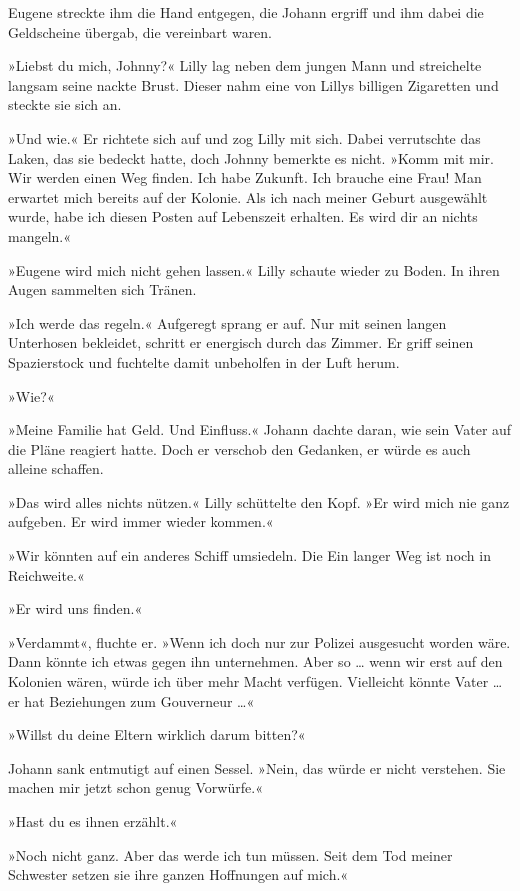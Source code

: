 Eugene streckte ihm die Hand entgegen, die Johann ergriff und ihm
dabei die Geldscheine übergab, die vereinbart waren.

\tb

»Liebst du mich, Johnny?« Lilly lag neben dem jungen Mann und
streichelte langsam seine nackte Brust. Dieser nahm eine von Lillys
billigen Zigaretten und steckte sie sich an.

»Und wie.« Er richtete sich auf und zog Lilly mit sich. Dabei
verrutschte das Laken, das sie bedeckt hatte, doch Johnny bemerkte
es nicht. »Komm mit mir. Wir werden einen Weg finden. Ich habe
Zukunft. Ich brauche eine Frau! Man erwartet mich bereits auf der
Kolonie. Als ich nach meiner Geburt ausgewählt wurde, habe ich
diesen Posten auf Lebenszeit erhalten. Es wird dir an nichts
mangeln.«

»Eugene wird mich nicht gehen lassen.« Lilly schaute wieder zu
Boden. In ihren Augen sammelten sich Tränen.

»Ich werde das regeln.« Aufgeregt sprang er auf. Nur mit seinen
langen Unterhosen bekleidet, schritt er energisch durch das Zimmer.
Er griff seinen Spazierstock und fuchtelte damit unbeholfen in der
Luft herum.

»Wie?«

»Meine Familie hat Geld. Und Einfluss.« Johann dachte daran, wie
sein Vater auf die Pläne reagiert hatte. Doch er verschob den
Gedanken, er würde es auch alleine schaffen.

»Das wird alles nichts nützen.« Lilly schüttelte den Kopf. »Er wird
mich nie ganz aufgeben. Er wird immer wieder kommen.«

»Wir könnten auf ein anderes Schiff umsiedeln. Die Ein langer Weg
ist noch in Reichweite.«

»Er wird uns finden.«

»Verdammt«, fluchte er. »Wenn ich doch nur zur Polizei ausgesucht
worden wäre. Dann könnte ich etwas gegen ihn unternehmen. Aber so
\ldots{} wenn wir erst auf den Kolonien wären, würde ich über mehr Macht
verfügen. Vielleicht könnte Vater … er hat Beziehungen zum
Gouverneur …«

»Willst du deine Eltern wirklich darum bitten?«

Johann sank entmutigt auf einen Sessel. »Nein, das würde er nicht
verstehen. Sie machen mir jetzt schon genug Vorwürfe.«

»Hast du es ihnen erzählt.«

»Noch nicht ganz. Aber das werde ich tun müssen. Seit dem Tod
meiner Schwester setzen sie ihre ganzen Hoffnungen auf mich.«

